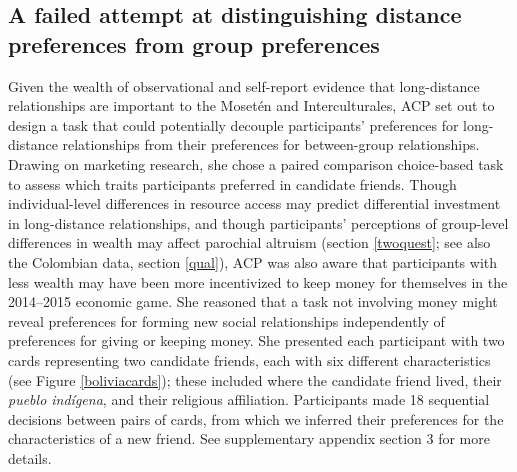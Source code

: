 \documentclass[bibauthoryear]{aa}
\begin{document}
\subsection{A failed attempt at distinguishing distance preferences from group preferences}

Given the wealth of observational and self-report evidence that long-distance relationships are important to the Moset\'en and Interculturales, ACP set out to design a task that could potentially decouple participants' preferences for long-distance relationships from their preferences for between-group relationships. Drawing on marketing research, she chose a paired comparison choice-based task \citep{rao2014applied} to assess which traits participants preferred in candidate friends. Though individual-level differences in resource access may predict differential investment in long-distance relationships, and though participants' perceptions of group-level differences in wealth may affect parochial altruism (section \ref{twoquest}; see also the Colombian data, section \ref{qual}), ACP was also aware that participants with less wealth may have been more incentivized to keep money for themselves in the 2014--2015 economic game. She reasoned that a task not involving money might reveal preferences for forming new social relationships independently of preferences for giving or keeping money. She presented each participant with two cards representing two candidate friends, each with six different characteristics (see Figure \ref{boliviacards}); these included where the candidate friend lived, their \textit{pueblo ind\'igena}, and their religious affiliation. Participants made 18 sequential decisions between pairs of cards, from which we inferred their preferences for the characteristics of a new friend. See supplementary appendix section 3 for more details.
\end{document}
